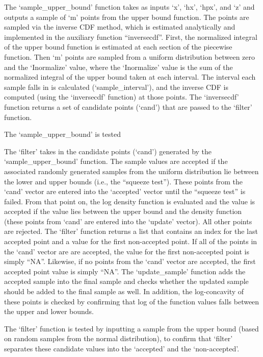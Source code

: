 \documentclass{article}
\begin{document}
The `sample\_upper\_bound' function takes as inputs `x', `hx', `hpx', and `z' and outputs a sample of `m' points from the upper bound function. The points are sampled via the inverse CDF method, which is estimated analytically and implemented in the auxiliary function ``inversecdf''. First, the normalized integral of the upper bound function is estimated at each section of the piecewise function. Then `m' points are sampled from a uniform distribution between zero and the `Inormalize' value, where the `Inormalize' value is the sum of the normalized integral of the upper bound taken at each interval.  The interval each sample falls in is calculated (`sample\_interval'), and the inverse CDF is computed (using the `inversecdf' function) at those points. The `inversecdf' function returns a set of candidate points (`cand') that are passed to the `filter' function.

The `sample\_upper\_bound' is tested 

The `filter' takes in the candidate points (`cand') generated by the `sample\_upper\_bound' function.  The sample values are accepted if the associated randomly generated samples from the uniform distribution lie between the lower and upper bounds (i.e., the ``squeeze test'').  These points from the `cand' vector are entered into the `accepted' vector until the ``squeeze test'' is failed.  From that point on, the log density function is evaluated and the value is accepted if the value lies between the upper bound and the density function (these points from `cand' are entered into the `update' vector).  All other points are rejected. The `filter' function returns a list that contains an index for the last accepted point and a value for the first non-accepted point.  If all of the points in the `cand' vector are are accepted, the value for the first non-accepted point is simply ``NA''.  Likewise, if no points from the `cand' vector are accepted, the first accepted point value is simply ``NA''.  The `update\_sample' function adds the accepted sample into the final sample and checks whether the updated sample should be added to the final sample as well.  In addition, the log-concavity of these points is checked by confirming that log of the function values falls between the upper and lower bounds.

The `filter' function is tested by inputting a sample from the upper bound (based on random samples from the normal distribution), to confirm that `filter' separates these candidate values into the `accepted' and the `non-accepted'.
\end{document}
